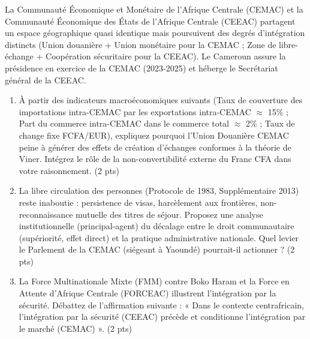 \documentclass[11pt]{article}
\begin{document}
\begin{exercice}
La Communauté Économique et Monétaire de l'Afrique Centrale (CEMAC) et la Communauté Économique des États de l'Afrique Centrale (CEEAC) partagent un espace géographique quasi identique mais poursuivent des degrés d'intégration distincts (Union douanière + Union monétaire pour la CEMAC ; Zone de libre-échange + Coopération sécuritaire pour la CEEAC). Le Cameroun assure la présidence en exercice de la CEMAC (2023-2025) et héberge le Secrétariat général de la CEEAC.
\begin{enumerate}
    \item À partir des indicateurs macroéconomiques suivants (Taux de couverture des importations intra-CEMAC par les exportations intra-CEMAC $\approx$ 15\% ; Part du commerce intra-CEMAC dans le commerce total $\approx$ 2\% ; Taux de change fixe FCFA/EUR), expliquez pourquoi l'Union Douanière CEMAC peine à générer des effets de création d'échanges conformes à la théorie de Viner. Intégrez le rôle de la non-convertibilité externe du Franc CFA dans votre raisonnement. (2 pts)
    \item La libre circulation des personnes (Protocole de 1983, Supplémentaire 2013) reste inaboutie : persistence de visas, harcèlement aux frontières, non-reconnaissance mutuelle des titres de séjour. Proposez une analyse institutionnelle (principal-agent) du décalage entre le droit communautaire (supériorité, effet direct) et la pratique administrative nationale. Quel levier le Parlement de la CEMAC (siégeant à Yaoundé) pourrait-il actionner ? (2 pts)
    \item La Force Multinationale Mixte (FMM) contre Boko Haram et la Force en Attente d'Afrique Centrale (FORCEAC) illustrent l'intégration par la sécurité. Débattez de l'affirmation suivante : « Dans le contexte centrafricain, l'intégration par la sécurité (CEEAC) précède et conditionne l'intégration par le marché (CEMAC) ». (2 pts)
\end{enumerate}
\end{exercice}
\end{document}
